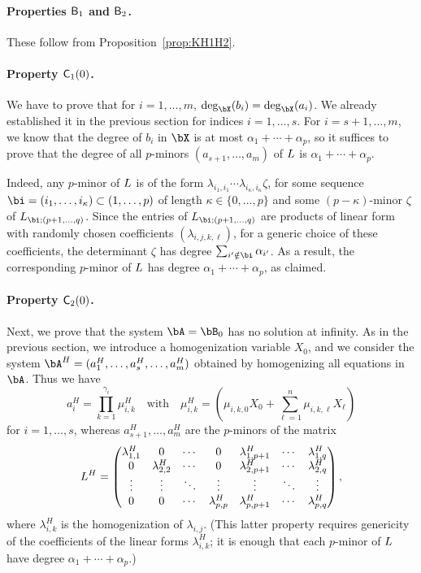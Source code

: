 \documentclass[12pt]{article}
\begin{document}
\paragraph{Properties $\mathsf{B}_1$ and $\mathsf{B}_2$.}
These follow from Proposition~\ref{prop:KH1H2}.

\paragraph{Property $\mathsf{C}_1(0)$.} We have to prove that for $i=1,\dots,m$,
$\deg_\bX(b_i)=\deg_\bX(a_i)$. We already established it in the
previous section for indices $i=1,\dots,s$. For $i=s+1,\dots,m$, we
know that the degree of $b_i$ in $\bX$ is at most $\alpha_1 + \cdots +
\alpha_p$, so it suffices to prove that the degree of all $p$-minors
$(a_{s+1},\dots,a_m)$ of ${L}$ is $\alpha_1 + \cdots + \alpha_p$.

Indeed, any $p$-minor of ${L}$ is of the form $\lambda_{i_1,i_1}
\cdots \lambda_{i_\kappa,i_\kappa} \zeta$, for some sequence
$\bi=(i_1,\dots,i_\kappa) \subset (1,\dots,p)$ of length $\kappa \in
\{0,\dots,p\}$ and some $(p-\kappa)$-minor $\zeta$ of $\mL_{\bi
  \mathbf{;}(p+1,\dots,q)}$.  Since the entries of $\mL_{\bi
  \mathbf{;}(p+1,\dots,q)}$ are products of linear form with randomly
chosen coefficients $(\lambda_{i,j,k,\ell})$, for a generic choice of
these coefficients, the determinant $\zeta$ has degree
$\sum_{i' \notin \bi} \alpha_{i'}$. As a result, the corresponding
$p$-minor of ${L}$ has degree $\alpha_1 + \cdots + \alpha_p$, as
claimed.

\paragraph{Property $\mathsf{C}_2(0)$.} Next, we prove that the system $\bA=\bB_0$ has no solution 
at infinity. As in the previous section, we introduce a homogenization
variable $X_0$, and we consider the system $\bA^H=(a_1^H,\dots,a_s^H,\dots,a_m^H)$ obtained 
by homogenizing all equations in $\bA$. Thus we have
$$a_i^H=\prod_{k=1}^{\gamma_i} \mu^H_{i,k} \quad\text{with}\quad \mu^H_{i,k}=(\mu_{i,k,0}X_0 + \sum_{\ell = 1}^{n}\mu_{i,k,\ell}X_\ell)$$
for $i=1,\dots,s$, whereas $a_{s+1}^H,\dots,a_m^H$ are the $p$-minors of the matrix
\begin{align*}
{L}^H = \left( \begin{matrix}
\lambda^H_{1,1} & 0 & \cdots & 0 & \lambda^H_{1,p+1} & \cdots & \lambda^H_{1, q}\\
0 & \lambda^H_{2,2} & \cdots & 0 & \lambda^H_{2,p+1} & \cdots & \lambda^H_{2, q}\\
\vdots & \vdots & \ddots & \vdots & \vdots & \ddots & \vdots\\
0 & 0 & \cdots & \lambda^H_{p,p} & \lambda^H_{p,p+1} & \cdots & \lambda^H_{p, q}
\end{matrix} \right),  
\end{align*}
where $\lambda^H_{i,k}$ is the homogenization of
$\lambda_{i,j}$. (This latter property requires genericity of the
coefficients of the linear forms $\lambda^H_{i,k}$; it is enough that 
each $p$-minor of ${L}$ have degree $\alpha_1 + \cdots + \alpha_p$.)
\end{document}
